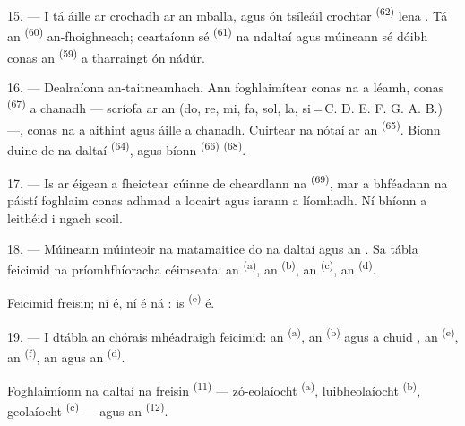 15. --- I  tá  áille ar crochadh ar an
mballa, agus ón tsíleáil crochtar  \textsuperscript{(62)} lena
. Tá an  \textsuperscript{(60)} an-fhoighneach;
ceartaíonn sé  \textsuperscript{(61)} na ndaltaí agus múineann
sé dóibh conas an  \textsuperscript{(59)} a tharraingt ón nádúr.

16. --- Dealraíonn  an-taitneamhach. Ann foghlaimítear conas
na  a léamh, conas 
\textsuperscript{(67)} a chanadh --- scríofa ar an  (do,
re, mi, fa, sol, la, si\,=\,C. D. E. F. G. A. B.) ---, conas na 
a aithint agus  áille a chanadh. Cuirtear na nótaí ar an
 \textsuperscript{(65)}. Bíonn duine de na daltaí  \textsuperscript{(64)}, agus bíonn 
\textsuperscript{(66)}  \textsuperscript{(68)}.

17. --- Is ar éigean a fheictear cúinne de cheardlann na 
\textsuperscript{(69)}, mar a bhféadann na páistí foghlaim conas adhmad a
locairt agus iarann a líomhadh. Ní bhíonn a leithéid i ngach scoil.

\VUsaut{5.0mm}
\VUsaut{3.6mm}

18. --- Múineann múinteoir na matamaitice do na daltaí 
 agus an . Sa tábla feicimid na
príomhfhíoracha céimseata: an  \textsuperscript{(a)}, an
 \textsuperscript{(b)}, an 
\textsuperscript{(c)}, an  \textsuperscript{(d)}.

Feicimid  freisin; ní  é, ní  é
ná : is  \textsuperscript{(e)} é.

19. --- I dtábla an chórais mhéadraigh feicimid: an 
\textsuperscript{(a)}, an  \textsuperscript{(b)} agus a chuid
, an  \textsuperscript{(e)}, an
 \textsuperscript{(f)}, an  agus an
 \textsuperscript{(d)}.

Foghlaimíonn na daltaí na  freisin
\textsuperscript{(11)} --- zó-eolaíocht \textsuperscript{(a)}, luibheolaíocht
\textsuperscript{(b)}, geolaíocht \textsuperscript{(c)} --- agus an
 \textsuperscript{(12)}.

